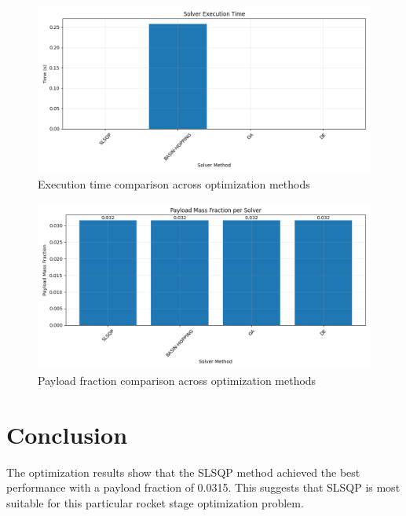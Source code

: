 \documentclass{article}
\begin{document}
\begin{figure}[H]
\centering
\includegraphics[width=\textwidth]{execution_time.png}
\caption{Execution time comparison across optimization methods}
\label{fig:execution-time}
\end{figure}

\begin{figure}[H]
\centering
\includegraphics[width=\textwidth]{payload_fraction.png}
\caption{Payload fraction comparison across optimization methods}
\label{fig:payload-fraction}
\end{figure}

\section{Conclusion}
The optimization results show that the SLSQP method achieved the best performance with a payload fraction of 0.0315. This suggests that SLSQP is most suitable for this particular rocket stage optimization problem.
\end{document}
